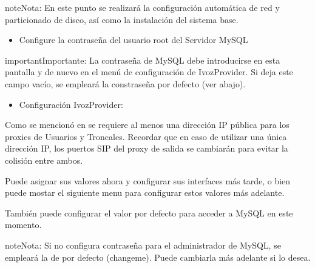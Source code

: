 \documentclass[letterpaper,10pt,spanish]{sphinxmanual}
\begin{document}
\noindent{}

\begin{notice}{note}{Nota:}
En este punto se realizará la configuración automática de red y particionado de disco, así como la instalación del sistema base.
\end{notice}
\begin{itemize}
\item {} 
Configure la contraseña del usuario root del Servidor MySQL

\end{itemize}

\noindent{}

\begin{notice}{important}{Importante:}
La contraseña de MySQL debe introducirse en esta pantalla y de nuevo en el menú de configuración de IvozProvider. Si deja este campo vacío, se empleará la constraseña por defecto (ver abajo).
\end{notice}
\begin{itemize}
\item {} 
Configuración IvozProvider:

\end{itemize}

\noindent{}

Como se mencionó en {\hyperref[basic_concepts/installation/requirements:requisitos\string-minimos]{}} se requiere al menos una dirección IP pública para los proxies de Usuarios y Troncales. Recordar que en caso de utilizar una única dirección IP, los puertos SIP del proxy de salida se cambiarán para evitar la colisión entre ambos.

Puede asignar sus valores ahora y configurar sus interfaces más tarde, o bien puede mostar el siguiente menu para configurar estos valores más adelante.

\noindent{}

También puede configurar el valor por defecto para acceder a MySQL en este momento.

\begin{notice}{note}{Nota:}
Si no configura contraseña para el administrador de MySQL, se empleará la de por defecto (changeme). Puede cambiarla más adelante si lo desea.
\end{notice}

\noindent{}
\end{document}

